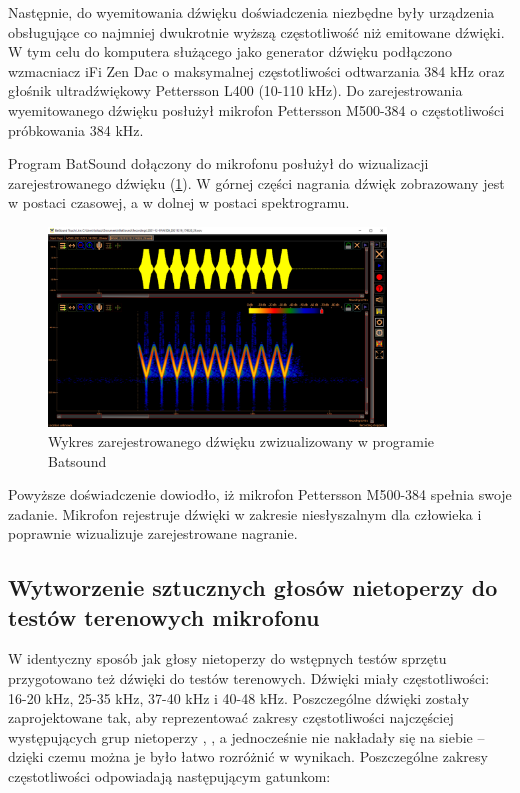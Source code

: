 \documentclass{sprz}
\begin{document}
Następnie, do wyemitowania dźwięku doświadczenia niezbędne były urządzenia obsługujące co najmniej dwukrotnie wyższą częstotliwość niż emitowane dźwięki. W tym celu do komputera służącego jako generator dźwięku podłączono wzmacniacz iFi Zen Dac o maksymalnej częstotliwości odtwarzania 384 kHz oraz głośnik ultradźwiękowy Pettersson L400 (10-110 kHz). Do zarejestrowania wyemitowanego dźwięku posłużył mikrofon Pettersson M500-384 o częstotliwości próbkowania 384 kHz.

Program BatSound dołączony do mikrofonu posłużył do wizualizacji zarejestrowanego dźwięku (\ref{img:batsound}). W górnej części nagrania dźwięk zobrazowany jest w postaci czasowej, a w dolnej w postaci spektrogramu.

\begin{figure}[h]
    \centering
    \includegraphics[width=0.8\textwidth]{sprz/batsound}
    \caption{Wykres zarejestrowanego dźwięku zwizualizowany w programie Batsound}
    \label{img:batsound}
\end{figure}

Powyższe doświadczenie dowiodło, iż mikrofon Pettersson M500-384 spełnia swoje zadanie. Mikrofon rejestruje dźwięki w zakresie niesłyszalnym dla człowieka i poprawnie wizualizuje zarejestrowane nagranie.

\subsection{Wytworzenie sztucznych głosów nietoperzy do testów terenowych mikrofonu}
W identyczny sposób jak głosy nietoperzy do wstępnych testów sprzętu przygotowano też dźwięki do testów terenowych. Dźwięki miały częstotliwości: 16-20 kHz, 25-35 kHz, 37-40 kHz i 40-48 kHz. Poszczególne dźwięki zostały zaprojektowane tak, aby reprezentować zakresy częstotliwości najczęściej występujących grup nietoperzy \cite{sachanowicz}, \cite{sachanowicz2}, a jednocześnie nie nakładały się na siebie – dzięki czemu można je było łatwo rozróżnić w wynikach. Poszczególne zakresy częstotliwości odpowiadają następującym gatunkom:
\end{document}

